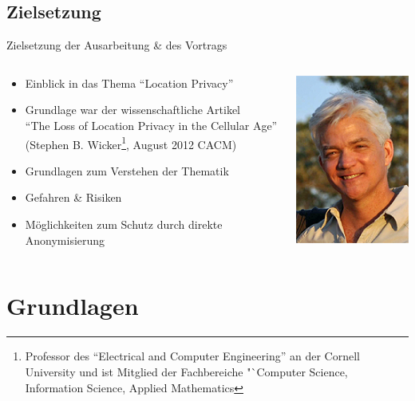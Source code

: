 \subsection{Zielsetzung}
\begin{frame}{Zielsetzung der Ausarbeitung \& des Vortrags}
\begin{columns}
  \begin{column}{.85\textwidth}
    \begin{itemize}
      \item Einblick in das Thema "`Location Privacy"'
      \item Grundlage war der wissenschaftliche Artikel\\
      "`The Loss of Location Privacy in the Cellular Age"'\\
      (Stephen B. Wicker\footnote[frame]{Professor des "`Electrical and Computer Engineering"' an der Cornell University und ist Mitglied der Fachbereiche "`Computer Science, Information Science, Applied Mathematics}, August 2012 CACM)
      \item Grundlagen zum Verstehen der Thematik
      \item Gefahren \& Risiken
      \item Möglichkeiten zum Schutz durch direkte Anonymisierung
    \end{itemize}
  \end{column}
  \begin{column}{.15\textwidth}
    \begin{center}
      \includegraphics[scale=.3]{images/Stephen-Wicker.jpg}
    \end{center}
  \end{column}
\end{columns}
\end{frame}

\section{Grundlagen}
